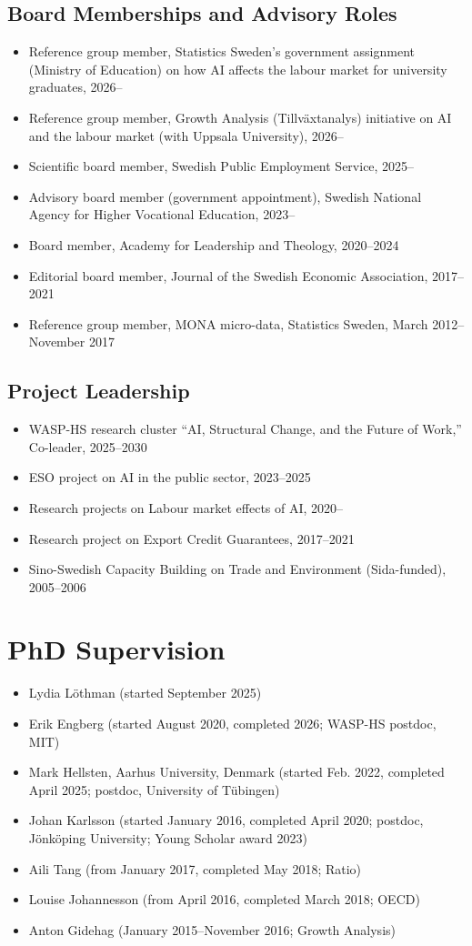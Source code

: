 \documentclass[11pt,a4paper]{article}
\newcommand{\cventry}[1]{\item #1}
\begin{document}
\subsection{Board Memberships and Advisory Roles}
\begin{itemize}
 \cventry{Reference group member, Statistics Sweden's government assignment (Ministry of Education) on how AI affects the labour market for university graduates, 2026--}
 \cventry{Reference group member, Growth Analysis (Tillv\"axtanalys) initiative on AI and the labour market (with Uppsala University), 2026--}
 \cventry{Scientific board member, Swedish Public Employment Service, 2025--}
 \cventry{Advisory board member (government appointment), Swedish National Agency for Higher Vocational Education, 2023--}
 \cventry{Board member, Academy for Leadership and Theology, 2020--2024}
 \cventry{Editorial board member, Journal of the Swedish Economic Association, 2017--2021}
 \cventry{Reference group member, MONA micro-data, Statistics Sweden, March 2012--November 2017}
\end{itemize}

\subsection{Project Leadership}
\begin{itemize}
 \cventry{WASP-HS research cluster ``AI, Structural Change, and the Future of Work,'' Co-leader, 2025--2030}
 \cventry{ESO project on AI in the public sector, 2023--2025}
 \cventry{Research projects on Labour market effects of AI, 2020--}
 \cventry{Research project on Export Credit Guarantees, 2017--2021}
 \cventry{Sino-Swedish Capacity Building on Trade and Environment (Sida-funded), 2005--2006}
\end{itemize}

\section{PhD Supervision}

\begin{itemize}
 \cventry{Lydia Löthman (started September 2025)}
 \cventry{Erik Engberg (started August 2020, completed 2026; WASP-HS postdoc, MIT)}
 \cventry{Mark Hellsten, Aarhus University, Denmark (started Feb. 2022, completed April 2025; postdoc, University of Tübingen)} %
 \cventry{Johan Karlsson (started January 2016, completed April 2020; postdoc, Jönköping University; Young Scholar award 2023)}
 \cventry{Aili Tang (from January 2017, completed May 2018; Ratio)}
 \cventry{Louise Johannesson (from April 2016, completed March 2018; OECD)}
 \cventry{Anton Gidehag (January 2015--November 2016; Growth Analysis)}
\end{itemize}
\end{document}
